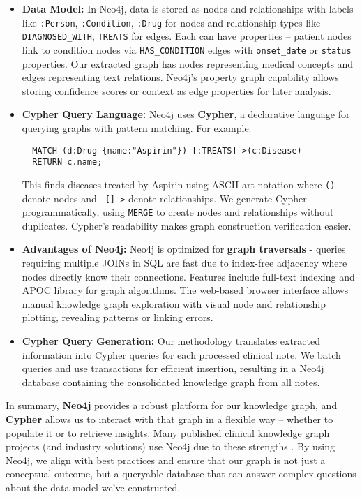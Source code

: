 \begin{itemize}
\item \textbf{Data Model:} In Neo4j, data is stored as nodes and relationships with labels like \texttt{\string:Person}, \texttt{\string:Condition}, \texttt{\string:Drug} for nodes and relationship types like \texttt{DIAGNOSED\_WITH}, \texttt{TREATS} for edges. Each can have properties -- patient nodes link to condition nodes via \texttt{HAS\_CONDITION} edges with \texttt{onset\_date} or \texttt{status} properties. Our extracted graph has nodes representing medical concepts and edges representing text relations. Neo4j's property graph capability allows storing confidence scores or context as edge properties for later analysis.

\item \textbf{Cypher Query Language:} Neo4j uses \textbf{Cypher}, a declarative language for querying graphs with pattern matching. For example:
\begin{verbatim}
  MATCH (d:Drug {name:"Aspirin"})-[:TREATS]->(c:Disease)
  RETURN c.name;
\end{verbatim}
This finds diseases treated by Aspirin using ASCII-art notation where \texttt{()} denote nodes and \texttt{-[]->} denote relationships. We generate Cypher programmatically, using \texttt{MERGE} to create nodes and relationships without duplicates. Cypher's readability makes graph construction verification easier.

\item \textbf{Advantages of Neo4j:} Neo4j is optimized for \textbf{graph traversals} - queries requiring multiple JOINs in SQL are fast due to index-free adjacency where nodes directly know their connections. Features include full-text indexing and APOC library for graph algorithms. The web-based browser interface allows manual knowledge graph exploration with visual node and relationship plotting, revealing patterns or linking errors.

\item \textbf{Cypher Query Generation:} Our methodology translates extracted information into Cypher queries for each processed clinical note. We batch queries and use transactions for efficient insertion, resulting in a Neo4j database containing the consolidated knowledge graph from all notes.\end{itemize}

In summary, \textbf{Neo4j} provides a robust platform for our knowledge graph, and \textbf{Cypher} allows us to interact with that graph in a flexible way – whether to populate it or to retrieve insights. Many published clinical knowledge graph projects (and industry solutions) use Neo4j due to these strengths \parencite{Zimbres2024}. By using Neo4j, we align with best practices and ensure that our graph is not just a conceptual outcome, but a queryable database that can answer complex questions about the data model we've constructed.

